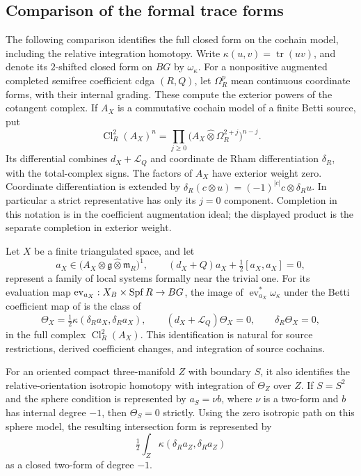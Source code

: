 \subsection{Comparison of the formal trace forms}
\label{subsec:formal-trace-statement}

The following comparison identifies the full closed form on the cochain
model, including the relative integration homotopy.  Write
\(\kappa(u,v)=\operatorname{tr}(uv)\), and denote its \(2\)-shifted
closed form on \(BG\) by \(\omega_\kappa\).
For a nonpositive augmented completed semifree coefficient cdga \((R,Q)\), let
\(\Omega_R^p\) mean continuous coordinate forms, with their internal
grading.  These compute the exterior powers of the cotangent complex.
If \(A_X\) is a commutative cochain model of a finite Betti source, put
\[
 \operatorname{Cl}^2_R(A_X)^n
   =\prod_{j\geq0}
        \bigl(A_X\widehat\otimes\Omega_R^{2+j}\bigr)^{n-j}.
\]
Its differential combines \(d_X+\mathcal L_Q\) and coordinate de Rham
differentiation \(\delta_R\), with the total-complex signs.
The factors of \(A_X\) have exterior weight zero.
Coordinate differentiation is extended by
\(\delta_R(c\otimes u)=(-1)^{|c|}c\otimes\delta_Ru\).
In particular a strict representative has only its \(j=0\) component.
Completion in this notation is in the coefficient augmentation ideal;
the displayed product is the separate completion in exterior weight.

\begin{proposition}
\label{prop:formal-trace-comparison}
Let \(X\) be a finite triangulated space, and let
\[
 a_X\in
  \bigl(A_X\otimes\mathfrak g\widehat\otimes\mathfrak m_R\bigr)^1,
 \qquad
 (d_X+Q)a_X+\tfrac12[a_X,a_X]=0,
\]
represent a family of local systems formally near the trivial one.
For its evaluation map
\(\operatorname{ev}_{a_X}:X_B\times\operatorname{Spf} R\to BG\), the image of
\(\operatorname{ev}_{a_X}^*\omega_\kappa\) under the Betti
coefficient map of \cite[\S2.1]{PTVV2013} is the class of
\begin{equation}
\label{eq:formal-trace-representative}
 \Theta_X=\tfrac12\kappa(\delta_Ra_X,\delta_Ra_X),
 \qquad
 (d_X+\mathcal L_Q)\Theta_X=0,\qquad \delta_R\Theta_X=0,
\end{equation}
in the full complex \(\operatorname{Cl}^2_R(A_X)\).
This identification is natural for source restrictions, derived
coefficient changes, and integration of source cochains.

For an oriented compact three-manifold \(Z\) with boundary \(S\), it
also identifies the relative-orientation isotropic homotopy with
integration of \(\Theta_Z\) over \(Z\).  If \(S=S^2\) and the sphere
condition is represented by \(a_S=\nu b\), where \(\nu\) is a
two-form and \(b\) has internal degree \(-1\), then
\(\Theta_S=0\) strictly.  Using the zero isotropic path on this sphere
model, the resulting intersection form is represented by
\[
                 \tfrac12\int_Z
                     \kappa(\delta_Ra_Z,\delta_Ra_Z)
\]
as a closed two-form of degree \(-1\).
\end{proposition}

